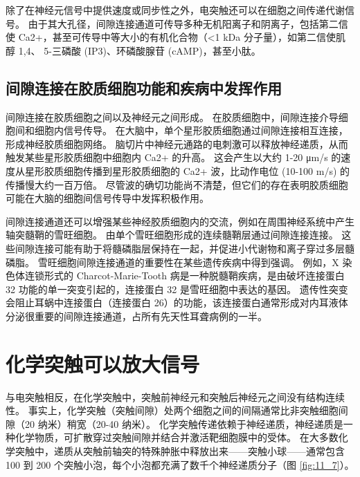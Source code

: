 除了在神经元信号中提供速度或同步性之外，电突触还可以在细胞之间传递代谢信号。 
由于其大孔径，间隙连接通道可传导多种无机阳离子和阴离子，包括第二信使 Ca2+，甚至可传导中等大小的有机化合物（<1 kDa 分子量），如第二信使肌醇 1,4、 5-三磷酸 (IP3)、环磷酸腺苷 (cAMP)，甚至小肽。


\subsection{间隙连接在胶质细胞功能和疾病中发挥作用}
间隙连接在胶质细胞之间以及神经元之间形成。 
在胶质细胞中，间隙连接介导细胞间和细胞内信号传导。 
在大脑中，单个星形胶质细胞通过间隙连接相互连接，形成神经胶质细胞网络。 
脑切片中神经元通路的电刺激可以释放神经递质，从而触发某些星形胶质细胞中细胞内 Ca2+ 的升高。 
这会产生以大约 1-20 μm/s 的速度从星形胶质细胞传播到星形胶质细胞的 Ca2+ 波，比动作电位 (10-100 m/s) 的传播慢大约一百万倍。 
尽管波的确切功能尚不清楚，但它们的存在表明胶质细胞可能在大脑的细胞间信号传导中发挥积极作用。


间隙连接通道还可以增强某些神经胶质细胞内的交流，例如在周围神经系统中产生轴突髓鞘的雪旺细胞。 
由单个雪旺细胞形成的连续髓鞘层通过间隙连接连接。 
这些间隙连接可能有助于将髓磷脂层保持在一起，并促进小代谢物和离子穿过多层髓磷脂。 
雪旺细胞间隙连接通道的重要性在某些遗传疾病中得到强调。
例如，X 染色体连锁形式的 Charcot-Marie-Tooth 病是一种脱髓鞘疾病，是由破坏连接蛋白 32 功能的单一突变引起的，连接蛋白 32 是雪旺细胞中表达的基因。 
遗传性突变会阻止耳蜗中连接蛋白（连接蛋白 26）的功能，该连接蛋白通常形成对内耳液体分泌很重要的间隙连接通道，占所有先天性耳聋病例的一半。


\section{化学突触可以放大信号}

与电突触相反，在化学突触中，突触前神经元和突触后神经元之间没有结构连续性。 
事实上，化学突触（突触间隙）处两个细胞之间的间隔通常比非突触细胞间隙（20 纳米）稍宽（20-40 纳米）。 
化学突触传递依赖于神经递质，神经递质是一种化学物质，可扩散穿过突触间隙并结合并激活靶细胞膜中的受体。 
在大多数化学突触中，递质从突触前轴突的特殊肿胀中释放出来——突触小球——通常包含 100 到 200 个突触小泡，每个小泡都充满了数千个神经递质分子（图 \ref{fig:11_7}）。


